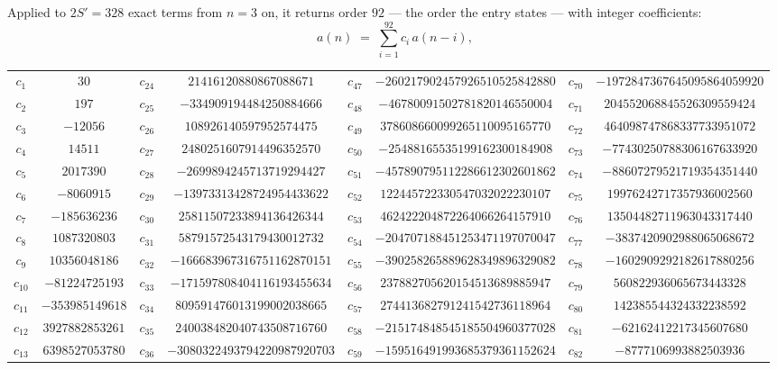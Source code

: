 \documentclass[11pt,a4paper]{article}
\theoremstyle{plain}
\theoremstyle{definition}
\begin{document}
Applied to $2S'=328$ exact terms from $n=3$ on, it returns order $92$ --- the
order the entry states --- with integer coefficients:
\[
a(n)\;=\;\sum_{i=1}^{92}c_i\,a(n-i),
\]
\begin{center}\small
\begin{tabular}{cccccccc}
$c_{1}$ & $30$ & $c_{24}$ & $21416120880867088671$ & $c_{47}$ & $-260217902457926510525842880$ & $c_{70}$ & $-1972847367645095864059920$ \\
$c_{2}$ & $197$ & $c_{25}$ & $-334909194484250884666$ & $c_{48}$ & $-46780091502781820146550004$ & $c_{71}$ & $204552068845526309559424$ \\
$c_{3}$ & $-12056$ & $c_{26}$ & $108926140597952574475$ & $c_{49}$ & $378608660099265110095165770$ & $c_{72}$ & $464098747868337733951072$ \\
$c_{4}$ & $14511$ & $c_{27}$ & $2480251607914496352570$ & $c_{50}$ & $-25488165535199162300184908$ & $c_{73}$ & $-77430250788306167633920$ \\
$c_{5}$ & $2017390$ & $c_{28}$ & $-2699894245713719294427$ & $c_{51}$ & $-457890795112286612302601862$ & $c_{74}$ & $-88607279521719354351440$ \\
$c_{6}$ & $-8060915$ & $c_{29}$ & $-13973313428724954433622$ & $c_{52}$ & $122445722330547032022230107$ & $c_{75}$ & $19976242717357936002560$ \\
$c_{7}$ & $-185636236$ & $c_{30}$ & $25811507233894136426344$ & $c_{53}$ & $462422204872264066264157910$ & $c_{76}$ & $13504482711963043317440$ \\
$c_{8}$ & $1087320803$ & $c_{31}$ & $58791572543179430012732$ & $c_{54}$ & $-204707188451253471197070047$ & $c_{77}$ & $-3837420902988065068672$ \\
$c_{9}$ & $10356048186$ & $c_{32}$ & $-166683967316751162870151$ & $c_{55}$ & $-390258265889628349896329082$ & $c_{78}$ & $-1602909292182617880256$ \\
$c_{10}$ & $-81224725193$ & $c_{33}$ & $-171597808404116193455634$ & $c_{56}$ & $237882705620154513689885947$ & $c_{79}$ & $560822936065673443328$ \\
$c_{11}$ & $-353985149618$ & $c_{34}$ & $809591476013199002038665$ & $c_{57}$ & $274413682791241542736118964$ & $c_{80}$ & $142385544324332238592$ \\
$c_{12}$ & $3927882853261$ & $c_{35}$ & $240038482040743508716760$ & $c_{58}$ & $-215174848545185504960377028$ & $c_{81}$ & $-62162412217345607680$ \\
$c_{13}$ & $6398527053780$ & $c_{36}$ & $-3080322493794220987920703$ & $c_{59}$ & $-159516491993685379361152624$ & $c_{82}$ & $-8777106993882503936$ \\

\end{tabular}
\end{center}
\end{document}
